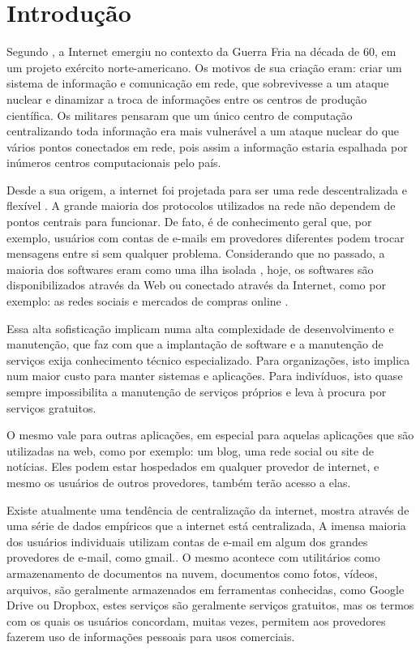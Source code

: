 \chapter{Introdução}
\label{cap-introducao}

Segundo \cite{giles2010psychology}, a Internet emergiu no contexto da Guerra Fria na década
de 60, em um projeto exército norte-americano. Os motivos de sua criação eram:
criar um sistema de informação e comunicação em rede, que
sobrevivesse a um ataque nuclear e dinamizar a troca de informações entre os centros de
produção científica. Os militares pensaram que um único centro de computação
centralizando toda informação era mais vulnerável a um ataque nuclear do que vários
pontos conectados em rede, pois assim a informação estaria espalhada por inúmeros
centros computacionais pelo país.

Desde a sua origem, a internet foi projetada para ser uma rede
descentralizada e flexível \cite{galaxia}. A grande maioria dos protocolos
utilizados na rede não dependem de pontos centrais para funcionar.
De fato, é de conhecimento geral
que, por exemplo, usuários com contas de e-mails em provedores diferentes podem
trocar mensagens entre si sem qualquer problema. Considerando que no
passado, a maioria dos softwares eram como uma ilha isolada \cite{byhand},
hoje, os softwares são disponibilizados através da Web ou conectado através da Internet,
como por exemplo: as redes sociais e mercados de compras online \cite{6265084}.

Essa alta sofisticação implicam numa alta complexidade de
desenvolvimento e manutenção, que faz com que a
implantação de software e a manutenção de serviços exija conhecimento técnico
especializado. Para organizações, isto implica num maior
custo para manter sistemas e aplicações. Para indivíduos, isto quase sempre
impossibilita a manutenção de serviços próprios e leva à procura por serviços
gratuitos.

O mesmo vale para outras aplicações, em especial para aquelas aplicações
que são utilizadas na web, como por exemplo: um blog, uma rede social ou site de
notícias. Eles podem estar hospedados em qualquer provedor de internet, e mesmo os
usuários de outros provedores, também terão acesso a elas.

Existe atualmente uma tendência de centralização da internet,\cite{vaz} mostra
através de uma série de dados empíricos que a internet está centralizada,
A imensa maioria dos usuários individuais utilizam contas de e-mail em algum
dos grandes provedores de e-mail, como gmail.\cite{shak2015}. O mesmo acontece com utilitários como armazenamento
de documentos na nuvem, documentos como fotos, vídeos, arquivos, são geralmente
armazenados em ferramentas conhecidas, como Google Drive ou Dropbox, estes serviços
são geralmente serviços gratuitos, mas os termos com os quais os usuários concordam,
muitas vezes, permitem aos provedores fazerem uso de informações pessoais para usos comerciais.

